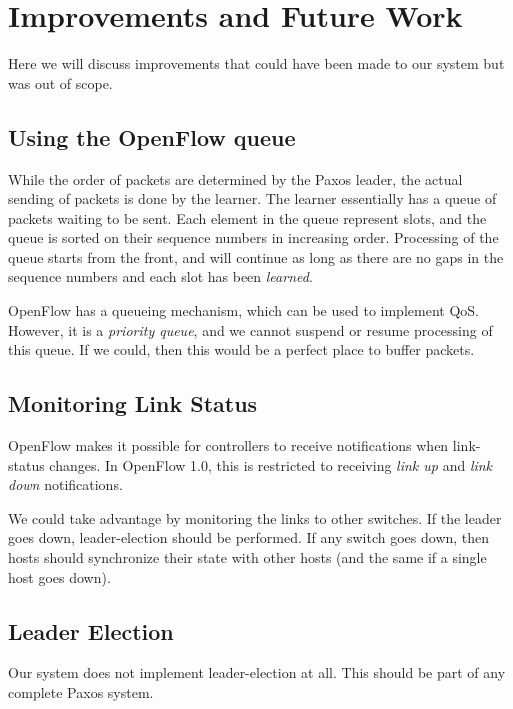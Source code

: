 \chapter{Improvements and Future Work}

Here we will discuss improvements that could have been made to our system
but was out of scope.

\section{Using the OpenFlow queue}

While the order of packets are determined by the Paxos leader, the actual
sending of packets is done by the learner.
%
The learner essentially has a queue of packets waiting to be sent.
%
Each element in the queue represent slots, and the queue is sorted on their
sequence numbers in increasing order.
%
Processing of the queue starts from the front, and will continue as long as
there are no gaps in the sequence numbers and each slot has been
\textit{learned}.

OpenFlow has a queueing mechanism, which can be used to implement \ac{QoS}.
%
However, it is a \textit{priority queue}, and we cannot suspend or resume
processing of this queue.
%
If we could, then this would be a perfect place to buffer packets.


\section{Monitoring Link Status}

OpenFlow makes it possible for controllers to receive notifications when
link-status changes.  In OpenFlow 1.0, this is restricted
to receiving \textit{link up} and \textit{link down}
notifications.

We could take advantage by monitoring the links to other switches.
If the leader goes down, leader-election should be performed.
If any switch goes down, then hosts should synchronize their state with
other hosts (and the same if a single host goes down).

\section{Leader Election}

Our system does not implement
leader-election at all.
This should be part of any complete Paxos system.

